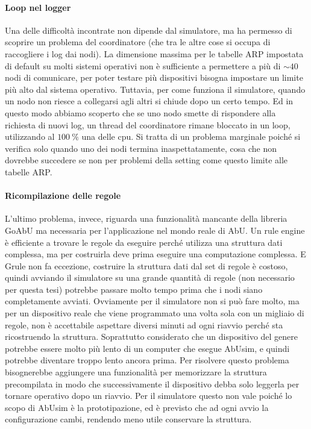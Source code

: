 \documentclass[12pt, a4paper]{article}
\begin{document}
\paragraph{Loop nel logger}

Una delle difficoltà incontrate non dipende dal simulatore, ma ha permesso di scoprire un problema del coordinatore (che tra le altre cose si occupa di raccogliere i log dai nodi).
La dimensione massima per le tabelle ARP impostata di default su molti sistemi operativi non è sufficiente a permettere a più di $\sim40$ nodi di comunicare, per poter testare più dispositivi bisogna impostare un limite più alto dal sistema operativo. Tuttavia, per come funziona il simulatore, quando un nodo non riesce a collegarsi agli altri si chiude dopo un certo tempo.
Ed in questo modo abbiamo scoperto che se uno nodo smette di rispondere alla richiesta di nuovi log, un thread del coordinatore rimane bloccato in un loop, utilizzando al $\qty{100}{\percent}$ una delle cpu.
Si tratta di un problema marginale poiché si verifica solo quando uno dei nodi termina inaspettatamente, cosa che non dovrebbe succedere se non per problemi della setting come questo limite alle tabelle ARP.

\paragraph{Ricompilazione delle regole}\label{ricompilazione}

L'ultimo problema, invece, riguarda una funzionalità mancante della libreria GoAbU ma necessaria per l'applicazione nel mondo reale di AbU.
Un rule engine è efficiente a trovare le regole da eseguire perché utilizza una struttura dati complessa, ma per costruirla deve prima eseguire una computazione complessa. E Grule non fa eccezione, costruire la struttura dati dal set di regole è costoso, quindi avviando il simulatore su una grande quantità di regole (non necessario per questa tesi) potrebbe passare molto tempo prima che i nodi siano completamente avviati.
Ovviamente per il simulatore non si può fare molto, ma per un dispositivo reale che viene programmato una volta sola con un migliaio di regole, non è accettabile aspettare diversi minuti ad ogni riavvio perché sta ricostruendo la struttura. Soprattutto considerato che un dispositivo del genere potrebbe essere molto più lento di un computer che esegue AbUsim, e quindi potrebbe diventare troppo lento ancora prima.
Per risolvere questo problema bisognerebbe aggiungere una funzionalità per memorizzare la struttura precompilata in modo che successivamente il dispositivo debba solo leggerla per tornare operativo dopo un riavvio. Per il simulatore questo non vale poiché lo scopo di AbUsim è la prototipazione, ed è previsto che ad ogni avvio la configurazione cambi, rendendo meno utile conservare la struttura.
\end{document}
